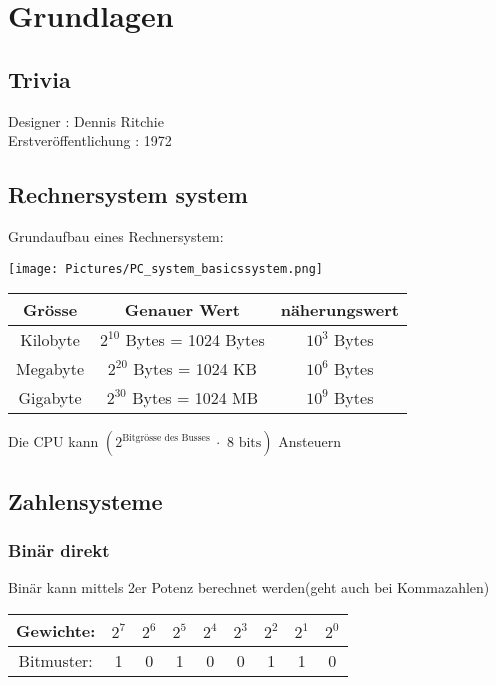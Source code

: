 
\section{Grundlagen}

\subsection{Trivia}

Designer : Dennis Ritchie \\
Erstveröffentlichung : 1972

\subsection{Rechnersystem system}

Grundaufbau eines Rechnersystem:

\texttt{[image: Pictures/PC\_system\_basicssystem.png]}

\begin{center}
    \begin{tabular}{|c|c|c|} \hline  
        Grösse & Genauer Wert & näherungswert \\ \hline  
        Kilobyte & $2^{10}$ Bytes = 1024 Bytes & $10^3$ Bytes \\ \hline  
        Megabyte & $2^{20}$ Bytes = 1024 KB & $10^6$ Bytes \\ \hline  
        Gigabyte & $2^{30}$ Bytes = 1024 MB & $10^9$ Bytes \\ \hline 
    \end{tabular}
\end{center}

Die CPU kann $(2^{\text{Bitgrösse des Busses }} \cdot \text{ 8 bits})$ Ansteuern

\subsection{Zahlensysteme}

\subsubsection{Binär direkt}

Binär kann mittels 2er Potenz berechnet werden(geht auch bei Kommazahlen)\\

\noindent
\begin{tabular}{|c|c|c|c|c|c|c|c|c|}
\hline
Gewichte: & \(2^7\) & \(2^6\) & \(2^5\) & \(2^4\) & \(2^3\) & \(2^2\) & \(2^1\) & \(2^0\) \\
\hline
Bitmuster: & 1 & 0 & 1 & 0 & 0 & 1 & 1 & 0 \\
\hline
\end{tabular}

